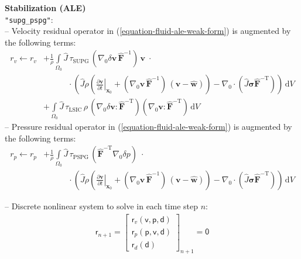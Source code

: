 \documentclass[a4paper,12pt]{report}
\newcommand{\bs}[1]{\boldsymbol{#1}}
\newcommand{\Om}{\mathit{\Omega}}
\newcommand{\ROP}{\bs{\mathsf{r}}}
\begin{document}
\textbf{Stabilization (ALE)}\\

\verb."supg_pspg".:\\
-- Velocity residual operator in (\ref{equation-fluid-ale-weak-form}) is augmented by the following terms:
\begin{equation}
\begin{aligned}
r_v \leftarrow r_v &+ \frac{1}{\rho}\int\limits_{\Om_0}\widehat{J}\, \tau_{\mathrm{SUPG}}\,(\nabla_0\delta\boldsymbol{v}\,\widehat{\boldsymbol{F}}^{-1})\,\boldsymbol{v}\;\cdot \\
& \qquad\quad \cdot\left(\widehat{J}\rho\left(\left.\frac{\partial \boldsymbol{v}}{\partial t}\right|_{\boldsymbol{x}_{0}} + (\nabla_0\boldsymbol{v}\,\widehat{\boldsymbol{F}}^{-1})\,(\boldsymbol{v}-\widehat{\boldsymbol{w}})\right) - \nabla_{0}\cdot\left(\widehat{J}\boldsymbol{\sigma}\widehat{\boldsymbol{F}}^{-\mathrm{T}}\right)\right)\,\mathrm{d}V \\
& + \int\limits_{\Om_0}\widehat{J}\, \tau_{\mathrm{LSIC}}\,\rho\,(\nabla_{0}\delta\boldsymbol{v} : \widehat{\boldsymbol{F}}^{-\mathrm{T}})(\nabla_{0}\boldsymbol{v} : \widehat{\boldsymbol{F}}^{-\mathrm{T}})\,\mathrm{d}V
\end{aligned}
\end{equation}
-- Pressure residual operator in (\ref{equation-fluid-ale-weak-form}) is augmented by the following terms:
\begin{equation}
\begin{aligned}
r_p \leftarrow r_p &+ \frac{1}{\rho}\int\limits_{\Om_0}\widehat{J}\, \tau_{\mathrm{PSPG}}\,(\widehat{\boldsymbol{F}}^{-\mathrm{T}}\nabla_{0}\delta p) \;\cdot \\
& \qquad\quad \cdot \left(\widehat{J}\rho\left(\left.\frac{\partial \boldsymbol{v}}{\partial t}\right|_{\boldsymbol{x}_{0}} + (\nabla_0\boldsymbol{v}\,\widehat{\boldsymbol{F}}^{-1})\,(\boldsymbol{v}-\widehat{\boldsymbol{w}})\right) - \nabla_{0}\cdot\left(\widehat{J}\boldsymbol{\sigma}\widehat{\boldsymbol{F}}^{-\mathrm{T}}\right)\right)\,\mathrm{d}V
\end{aligned}
\end{equation}

-- Discrete nonlinear system to solve in each time step $n$:
\begin{equation}
\label{equation-nonlin-sys-fluid-ale}
\begin{aligned}
\ROP_{n+1} = \begin{bmatrix} \ROP_{v}(\boldsymbol{\mathsf{v}},\boldsymbol{\mathsf{p}},\boldsymbol{\mathsf{d}}) \\ \ROP_{p}(\boldsymbol{\mathsf{p}},\boldsymbol{\mathsf{v}},\boldsymbol{\mathsf{d}}) \\ \ROP_{d}(\boldsymbol{\mathsf{d}}) \end{bmatrix}_{n+1} = \boldsymbol{\mathsf{0}}
\end{aligned}
\end{equation}
\end{document}
